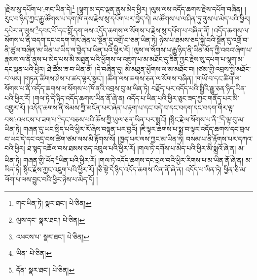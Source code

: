 །རྗེས་སུ་དཔོག་པ་:གང་ཡིན་དེ།\footnote{གང་ཡིན་ཏེ།  སྣར་ཐང་།  པེ་ཅིན། } །ལྷག་མ་དང་ལྡན་ནུས་མེད་ཕྱིར། །ལུས་ལས་འདོད་ཆགས་རྗེས་དཔོག་བཞིན། །རུང་བ་ཉིད་ཀྱང་རྒྱུ་ཚོགས་པ་དག་ཁོ་ནས་རྗེས་སུ་དཔོག་པར་བྱེད་དེ། མ་ཚོགས་པ་ལ་ཤིན་ཏུ་ནུས་པ་མེད་པའི་ཕྱིར། དཔེར་ན་ལུས་\footnote{ལུས་དང་  སྣར་ཐང་།  པེ་ཅིན། }དབང་པོ་དང་བློ་དག་ལས་འདོད་ཆགས་ལ་སོགས་པ་རྗེས་སུ་དཔོག་པ་བཞིན་ནོ། །འདོད་ཆགས་ལ་སོགས་པ་ནི་བདག་དང་བདག་གིར་ཞེན་པ་སྔོན་དུ་འགྲོ་བ་ཅན་ཡིན་ཏེ། ཉེས་པ་ཐམས་ཅད་སྐྱེ་བའི་སྔོན་དུ་འགྲོ་བ་ནི་ཚུལ་བཞིན་མ་ཡིན་པ་ཡིད་ལ་བྱེད་པ་ཡིན་པའི་ཕྱིར་རོ། །ལུས་ལ་སོགས་པ་རྒྱུ་ཉིད་ནི་ཡིན་མོད་ཀྱི་འབའ་ཞིག་པ་རྣམས་ལ་ནི་ནུས་པ་མེད་པས་མི་མཐུན་པའི་ཕྱོགས་ལ་འཇུག་པ་མ་མཐོང་དུ་ཟིན་ཀྱང་རྗེས་སུ་དཔག་པ་ལྷག་མ་དང་ལྡན་པའི་ཕྱིར། ཐེ་ཚོམ་ཟ་བ་ཡིན་ནོ། །དེ་བཞིན་དུ། མི་མཐུན་ཕྱོགས་ལ་མ་མཐོང་བ། །ཙམ་གྱི་འབྲས་སྤྱི་མཐོང་བ་ལས། །གཏན་ཚིགས་ཤེས་པ་ཚད་ལྟར་སྣང་། །ཚིག་ལས་ཆགས་ཅན་ལ་སོགས་བཞིན། །གཡོ་བ་དང་ཚིག་ལ་སོགས་པ་ནི་འདོད་ཆགས་ལ་སོགས་པ་ཁོ་ནའི་འབྲས་བུ་མ་ཡིན་ཏེ། བརྗོད་པར་འདོད་པའི་སྤྱིའི་རྒྱུ་ཅན་ཉིད་ཡིན་པའི་ཕྱིར་རོ། །གལ་ཏེ་དེ་ཉིད་འདོད་ཆགས་ཡིན་ནོ་ཞེ་ན། འདོད་པ་ཡིན་པའི་ཕྱིར་ཅུང་ཟད་ཀྱང་གནོད་པར་མི་འགྱུར་རོ། །འདོད་ཆགས་ནི་སེམས་ཀྱི་མངོན་པར་ཞེན་པ་རྟག་པ་དང་བདེ་བ་དང་བདག་དང་བདག་གིར་ལྟ་བས་:འཕངས་པ་ཟག་པ་\footnote{འཕངས་པ་  སྣར་ཐང་།  པེ་ཅིན། }དང་བཅས་པའི་ཆོས་ཀྱི་ཡུལ་ཅན་ཡིན་པར་སྨྲའོ། །སྙིང་རྗེ་ལ་སོགས་པ་ནི་\footnote{ཡིན་  པེ་ཅིན། }དེ་ལྟ་བུ་མ་ཡིན་ཏེ། གཞན་དུ་ཡང་སྲིད་པའི་ཕྱིར་རོ་ཞེས་བསྟན་པར་བྱའོ། །ཇི་ལྟར་ཆགས་པ་སྨྲ་བ་ལྟར་འདོད་ཆགས་དང་བྲལ་བ་ཡང་དེ་དང་འདྲ་བས་ཚིག་ཙམ་ལས་མི་རྟོགས་སོ། །ཁྱད་པར་ལས་ཀྱང་མ་ཡིན་ཏེ། བསམ་པ་ནི་རྟོགས་པར་དཀའ་བའི་ཕྱིར། ཐ་སྙད་འཆོལ་བས་ཐམས་ཅད་འཁྲུལ་པའི་ཕྱིར་རོ། །གལ་ཏེ་དགོས་པ་མེད་པའི་ཕྱིར་མི་སྨྲའོ་ཞེ་ན། མ་ཡིན་ཏེ། གཞན་གྱི་ཡོད་\footnote{དོན་  སྣར་ཐང་།  པེ་ཅིན། }ཡིན་པའི་ཕྱིར་རོ། །གལ་ཏེ་འདོད་ཆགས་དང་བྲལ་བའི་ཕྱིར་རིགས་པ་མ་ཡིན་ནོ་ཞེ་ན། མ་ཡིན་ཏེ། སྙིང་རྗེས་ཀྱང་འཇུག་པའི་ཕྱིར་རོ། །ཅི་སྟེ་དེ་ཉིད་འདོད་ཆགས་ཡིན་ནོ་ཞེ་ན། འདོད་པ་ཡིན་ཏེ། ཕྱིན་ཅི་མ་ལོག་པ་ལས་བྱུང་བའི་ཕྱིར་ཉེས་པ་མེད་དོ། །
